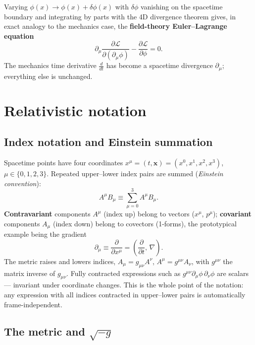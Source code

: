 \documentclass[12pt]{article}
\newcommand{\bx}{\mathbf{x}}
\newcommand{\Lag}{\mathcal{L}}
\begin{document}
Varying $\phi(x)\to\phi(x)+\delta\phi(x)$ with $\delta\phi$ vanishing
on the spacetime boundary and integrating by parts with the 4D
divergence theorem gives, in exact analogy to the mechanics case, the
\textbf{field-theory Euler--Lagrange equation}
%
\begin{equation}
  \partial_\mu\!\frac{\partial\Lag}{\partial(\partial_\mu\phi)}
    - \frac{\partial\Lag}{\partial\phi} = 0.
  \label{eq:field_EL}
\end{equation}
%
The mechanics time derivative $\frac{d}{dt}$ has become a spacetime
divergence $\partial_\mu$; everything else is unchanged.

\section{Relativistic notation}
\label{sec:relativity}

\subsection{Index notation and Einstein summation}
\label{sec:index}

Spacetime points have four coordinates
$x^\mu = (t, \bx) = (x^0, x^1, x^2, x^3)$, $\mu\in\{0,1,2,3\}$.
Repeated upper--lower index pairs are summed (\emph{Einstein
convention}):
%
\begin{equation}
  A^\mu B_\mu \equiv \sum_{\mu=0}^{3} A^\mu B_\mu.
\end{equation}
%
\textbf{Contravariant} components $A^\mu$ (index up) belong to
vectors ($x^\mu$, $p^\mu$); \textbf{covariant} components $A_\mu$
(index down) belong to covectors (1-forms), the prototypical example
being the gradient
%
\begin{equation}
  \partial_\mu \equiv \frac{\partial}{\partial x^\mu}
    = \left(\frac{\partial}{\partial t},\,\nabla\right).
\end{equation}
%
The metric raises and lowers indices, $A_\mu = g_{\mu\nu}A^\nu$,
$A^\mu = g^{\mu\nu}A_\nu$, with $g^{\mu\nu}$ the matrix inverse of
$g_{\mu\nu}$.  Fully contracted expressions such as
$g^{\mu\nu}\partial_\mu\phi\,\partial_\nu\phi$ are scalars ---
invariant under coordinate changes.  This is the whole point of the
notation: any expression with all indices contracted in upper--lower
pairs is automatically frame-independent.

\subsection{The metric and $\sqrt{-g}$}
\label{sec:metric}
\end{document}
